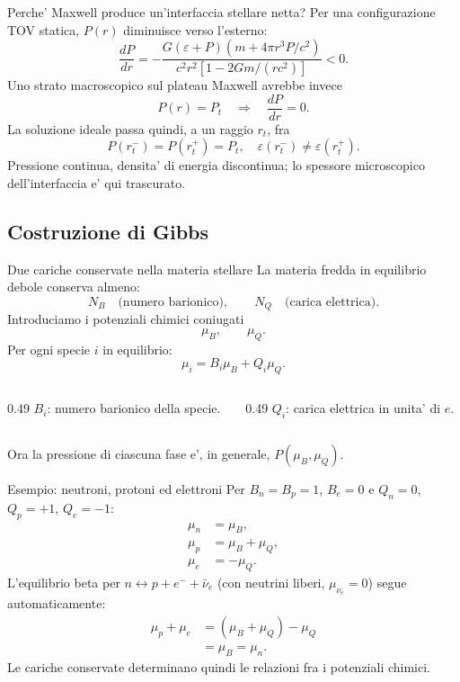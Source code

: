 \begin{frame}{Perche' Maxwell produce un'interfaccia stellare netta?}
\small
Per una configurazione TOV statica, $P(r)$ diminuisce verso l'esterno:
\[
\frac{dP}{dr}
=-\frac{G(\varepsilon+P)
(m+4\pi r^3P/c^2)}
{c^2r^2[1-2Gm/(rc^2)]}<0.
\]
Uno strato macroscopico sul plateau Maxwell avrebbe invece
\[
P(r)=P_t\quad\Longrightarrow\quad \frac{dP}{dr}=0.
\]
La soluzione ideale passa quindi, a un raggio $r_t$, fra
\[
P(r_t^-)=P(r_t^+)=P_t,
\quad\varepsilon(r_t^-)\ne\varepsilon(r_t^+).
\]
Pressione continua, densita' di energia discontinua;
lo spessore microscopico dell'interfaccia e' qui trascurato.
\end{frame}

\subsection{Costruzione di Gibbs}

\begin{frame}{Due cariche conservate nella materia stellare}
\small
La materia fredda in equilibrio debole conserva almeno:
\[
N_B\quad\text{(numero barionico)},
\qquad N_Q\quad\text{(carica elettrica)}.
\]
Introduciamo i potenziali chimici coniugati
\[
\mu_B,\qquad\mu_Q.
\]
Per ogni specie $i$ in equilibrio:
\[
\mu_i=B_i\mu_B+Q_i\mu_Q.
\]
\begin{columns}[T,onlytextwidth]
\begin{column}{0.49\textwidth}
$B_i$: numero barionico della specie.
\end{column}
\begin{column}{0.49\textwidth}
$Q_i$: carica elettrica in unita' di $e$.
\end{column}
\end{columns}
\medskip
Ora la pressione di ciascuna fase e', in generale,
$P(\mu_B,\mu_Q)$.
\end{frame}

\begin{frame}{Esempio: neutroni, protoni ed elettroni}
\small
Per $B_n=B_p=1$, $B_e=0$ e $Q_n=0$, $Q_p=+1$, $Q_e=-1$:
\[
\begin{aligned}
\mu_n&=\mu_B,\\
\mu_p&=\mu_B+\mu_Q,\\
\mu_e&=-\mu_Q.
\end{aligned}
\]
L'equilibrio beta per $n\leftrightarrow p+e^-+\bar\nu_e$
(con neutrini liberi, $\mu_{\nu_e}=0$) segue automaticamente:
\[
\begin{aligned}
\mu_p+\mu_e
&=(\mu_B+\mu_Q)-\mu_Q\\
&=\mu_B=\mu_n.
\end{aligned}
\]
Le cariche conservate determinano quindi le relazioni fra i potenziali chimici.
\end{frame}

